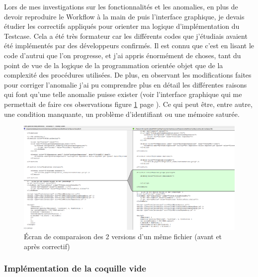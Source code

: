 Lors de mes investigations sur les fonctionnalit\'{e}s et les anomalies, en plus de devoir reproduire le \gls{Workflow} \`{a} la main de puis l'interface graphique, je devais \'{e}tudier les correctifs appliqu\'{e}s pour orienter ma logique d'impl\'{e}mentation du \gls{Testcase}. Cela a \'{e}t\'{e} tr\`{e}s formateur car les diff\'{e}rents codes que j'\'{e}tudiais avaient \'{e}t\'{e} impl\'{e}mentés par des d\'{e}veloppeurs confirm\'{e}s. Il est connu que c'est en lisant le code d'autrui que l'on progresse, et j'ai appris \'{e}norm\'{e}ment de choses, tant du point de vue de la logique de la programmation orient\'{e}e objet que de la complexit\'{e} des proc\'{e}dures utilis\'{e}es. De plus, en observant les modifications faites pour corriger l'anomalie j'ai pu comprendre plus en d\'{e}tail les diff\'{e}rentes raisons qui font qu'une telle anomalie puisse exister (voir l'interface graphique qui me permettait de faire ces observations figure \ref{figure:diffAgainst} page \pageref{figure:diffAgainst}). Ce qui peut \^{e}tre, entre autre, une condition manquante, un probl\`{e}me d'identifiant ou une m\'{e}moire satur\'{e}e.\\


\begin{figure}[!ht]
  \centering
      \includegraphics[width=\textwidth]{images/diffAgainst.png}
  \caption{\'{E}cran de comparaison des 2 versions d'un m\^{e}me fichier (avant et apr\`{e}s correctif)}
	\label{figure:diffAgainst}
\end{figure}




\subsubsection{Impl\'{e}mentation de la coquille vide}

